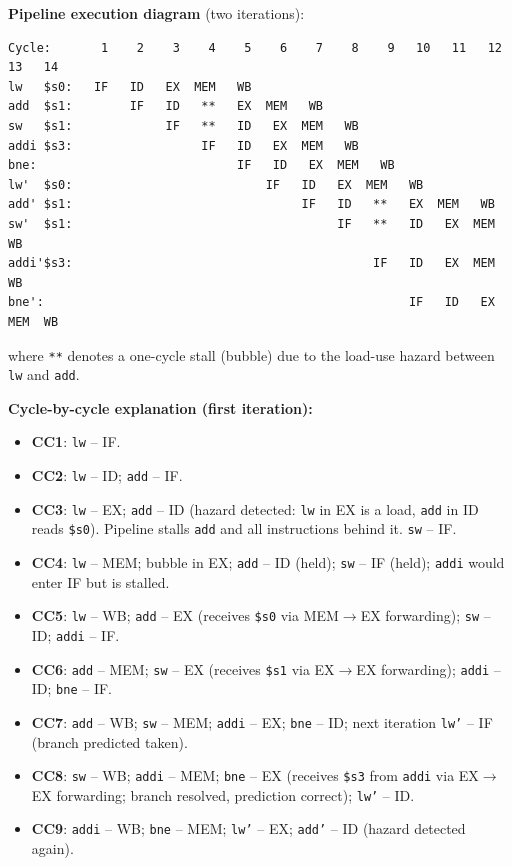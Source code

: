 \noindent \textbf{Pipeline execution diagram} (two iterations):

{\small
\begin{verbatim}
Cycle:       1    2    3    4    5    6    7    8    9   10   11   12   13   14
lw   $s0:   IF   ID   EX  MEM   WB
add  $s1:        IF   ID   **   EX  MEM   WB
sw   $s1:             IF   **   ID   EX  MEM   WB
addi $s3:                  IF   ID   EX  MEM   WB
bne:                            IF   ID   EX  MEM   WB
lw'  $s0:                           IF   ID   EX  MEM   WB
add' $s1:                                IF   ID   **   EX  MEM   WB
sw'  $s1:                                     IF   **   ID   EX  MEM   WB
addi'$s3:                                          IF   ID   EX  MEM   WB
bne':                                                   IF   ID   EX  MEM  WB
\end{verbatim}
}

\noindent where \texttt{**} denotes a one-cycle stall (bubble) due to the
load-use hazard between \texttt{lw} and \texttt{add}.

\noindent \textbf{Cycle-by-cycle explanation (first iteration):}
\begin{itemize}
  \item \textbf{CC1}: \texttt{lw} -- IF.
  \item \textbf{CC2}: \texttt{lw} -- ID; \texttt{add} -- IF.
  \item \textbf{CC3}: \texttt{lw} -- EX; \texttt{add} -- ID (hazard
        detected: \texttt{lw} in EX is a load, \texttt{add} in ID reads
        \texttt{\$s0}).  Pipeline stalls \texttt{add} and all instructions
        behind it.  \texttt{sw} -- IF.
  \item \textbf{CC4}: \texttt{lw} -- MEM; bubble in EX; \texttt{add} -- ID
        (held); \texttt{sw} -- IF (held); \texttt{addi} would enter IF but is
        stalled.
  \item \textbf{CC5}: \texttt{lw} -- WB; \texttt{add} -- EX (receives
        \texttt{\$s0} via MEM$\to$EX forwarding); \texttt{sw} -- ID;
        \texttt{addi} -- IF.
  \item \textbf{CC6}: \texttt{add} -- MEM; \texttt{sw} -- EX (receives
        \texttt{\$s1} via EX$\to$EX forwarding); \texttt{addi} -- ID;
        \texttt{bne} -- IF.
  \item \textbf{CC7}: \texttt{add} -- WB; \texttt{sw} -- MEM;
        \texttt{addi} -- EX; \texttt{bne} -- ID; next iteration
        \texttt{lw'} -- IF (branch predicted taken).
  \item \textbf{CC8}: \texttt{sw} -- WB; \texttt{addi} -- MEM;
        \texttt{bne} -- EX (receives \texttt{\$s3} from \texttt{addi} via
        EX$\to$EX forwarding; branch resolved, prediction correct);
        \texttt{lw'} -- ID.
  \item \textbf{CC9}: \texttt{addi} -- WB; \texttt{bne} -- MEM;
        \texttt{lw'} -- EX; \texttt{add'} -- ID (hazard detected again).
\end{itemize}

